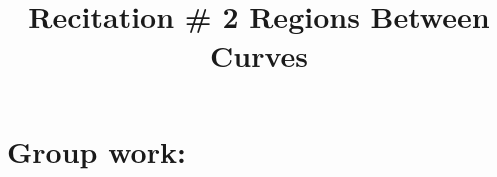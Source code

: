 \documentclass[noinstructornotes]{ximera}
\title{Recitation \# 2 Regions Between Curves}
\begin{document}
\begin{abstract}		\end{abstract}
\maketitle

\section{Group work:}
\end{document}

